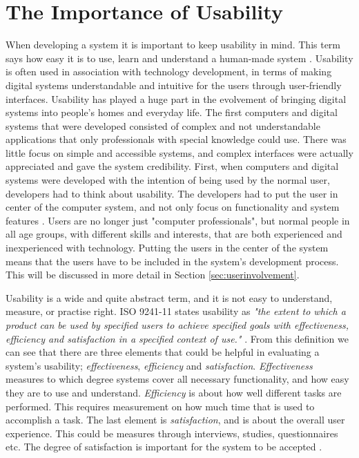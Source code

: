 \section{The Importance of Usability}
\label{sec:usability}
When developing a system it is important to keep usability in mind. This term says how easy it is to use, learn and understand a human-made system \cite{mmi}. Usability is often used in association with technology development, in terms of making digital systems understandable and intuitive for the users through user-friendly interfaces. Usability has played a huge part in the evolvement of bringing digital systems into people's homes and everyday life. The first computers and digital systems that were developed consisted of complex and not understandable applications that only professionals with special knowledge could use. There was little focus on simple and accessible systems, and complex interfaces were actually appreciated and gave the system credibility. First, when computers and digital systems were developed with the intention of being used by the normal user, developers had to think about usability. The developers had to put the user in center of the computer system, and not only focus on functionality and system features \cite{mmi}. Users are no longer just "computer professionals", but normal people in all age groups, with different skills and interests, that are both experienced and inexperienced with technology. Putting the users in the center of the system means that the users have to be included in the system's development process. This will be discussed in more detail in Section \ref{sec:userinvolvement}.  

Usability is a wide and quite abstract term, and it is not easy to understand, measure, or practise right. ISO 9241-11 states usability as \emph{"the extent to which a product can be used by specified users to achieve specified goals with effectiveness, efficiency and satisfaction in a specified context of use."} \cite{jokela2003standard}. From this definition we can see that there are three elements that could be helpful in evaluating a system's usability; \emph{effectiveness}, \emph{efficiency} and \emph{satisfaction}. \emph{Effectiveness} measures to which degree systems cover all necessary functionality, and how easy they are to use and understand. \emph{Efficiency} is about how well different tasks are performed. This requires measurement on how much time that is used to accomplish a task. The last element is \emph{satisfaction}, and is about the overall user experience. This could be measures through interviews, studies, questionnaires etc. The degree of satisfaction is important for the system to be accepted \cite{mmi}. 

